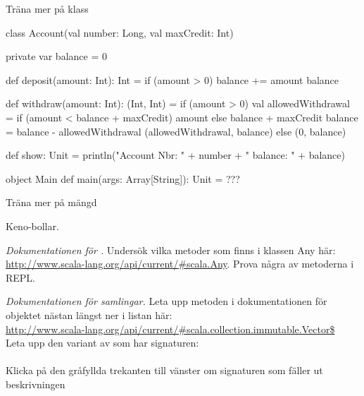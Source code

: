\Subtask {}

\Subtask {}

\Subtask {}

\Subtask {}

\Subtask {}

\ExtraTasks %


\Task Träna mer på  klass

\begin{Code}
class Account(val number: Long, val maxCredit: Int){ 
  private var balance = 0
  
  def deposit(amount: Int): Int = { 
    if (amount > 0) {balance += amount}
    balance
  }
  
  def withdraw(amount: Int): (Int, Int) = if (amount > 0) { 
    val allowedWithdrawal = 
      if (amount < balance + maxCredit) amount 
      else balance + maxCredit 
    balance = balance - allowedWithdrawal
    (allowedWithdrawal, balance)
  } else (0, balance)
  
  def show: Unit = 
    println("Account Nbr: " + number + " balance: " + balance) 
}

object Main {
  def main(args: Array[String]): Unit = {
    ???
  }
}
\end{Code}



\Task Träna mer på mängd  

\Subtask Keno-bollar.






\AdvancedTasks %

\Task \emph{Dokumentationen för .} Undersök vilka metoder som finns i klassen Any här: \href{http://www.scala-lang.org/api/current/\#scala.Any}{http://www.scala-lang.org/api/current/\#scala.Any}. Prova några av metoderna i REPL.

\Task \emph{Dokumentationen för samlingar.} Leta upp metoden  i dokumentationen för objektet  nästan längst ner i listan här: \\ \href{http://www.scala-lang.org/api/current/#scala.collection.immutable.Vector$}{http://www.scala-lang.org/api/current/\#scala.collection.immutable.Vector\$} \\Leta upp den variant av  som har signaturen:\\ \\ Klicka på den gråfyllda trekanten till vänster om signaturen som fäller ut beskrivningen

